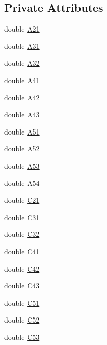 \subsection*{Private Attributes}
\begin{DoxyCompactItemize}
\item 
double \hyperlink{classodes_1_1Rodascc_a4d691a75b627e591251a32608a6909df}{A21}
\item 
double \hyperlink{classodes_1_1Rodascc_a362aebc9995ecb57983aca35d05c89c1}{A31}
\item 
double \hyperlink{classodes_1_1Rodascc_ac99ecd279f4ccef2420fdd22de1fd07e}{A32}
\item 
double \hyperlink{classodes_1_1Rodascc_a56c7326e1a6ada579e762688053f62b4}{A41}
\item 
double \hyperlink{classodes_1_1Rodascc_af4412ccfa9d2057e6f7f17dac8a98e30}{A42}
\item 
double \hyperlink{classodes_1_1Rodascc_acadbdb3873d2211266cc99f47d2b6bb4}{A43}
\item 
double \hyperlink{classodes_1_1Rodascc_a2e5e42ec31489631cbdcf6ab1292bb38}{A51}
\item 
double \hyperlink{classodes_1_1Rodascc_afdeaa138936b4f80eff32def6a4b9595}{A52}
\item 
double \hyperlink{classodes_1_1Rodascc_ac2b02599a93b12953db030cc1ebabd2b}{A53}
\item 
double \hyperlink{classodes_1_1Rodascc_a8a57cb705494dcf4a85d5e5a5c223cdf}{A54}
\item 
double \hyperlink{classodes_1_1Rodascc_a4d18523d9ee124366bbea21302e3f4b1}{C21}
\item 
double \hyperlink{classodes_1_1Rodascc_af9ada89328f5ef2b06b88d352fc0da6b}{C31}
\item 
double \hyperlink{classodes_1_1Rodascc_af4d022ac0b5b295414c28bedadee649d}{C32}
\item 
double \hyperlink{classodes_1_1Rodascc_a4b7e54a608ccdbb2dfb93c51ac39768e}{C41}
\item 
double \hyperlink{classodes_1_1Rodascc_ab5e8aff5c6f8ae319a99271ffbdb7c70}{C42}
\item 
double \hyperlink{classodes_1_1Rodascc_affb187bef97a0ef45d4f56537f731dfe}{C43}
\item 
double \hyperlink{classodes_1_1Rodascc_ad9c08c9ec5d296b2f948f66c2136984e}{C51}
\item 
double \hyperlink{classodes_1_1Rodascc_a00ebc3d1f52148b9224a42e351a98934}{C52}
\item 
double \hyperlink{classodes_1_1Rodascc_a3dfcbf36eb559c3c830f8aabbf078df9}{C53}

\end{DoxyCompactItemize}
